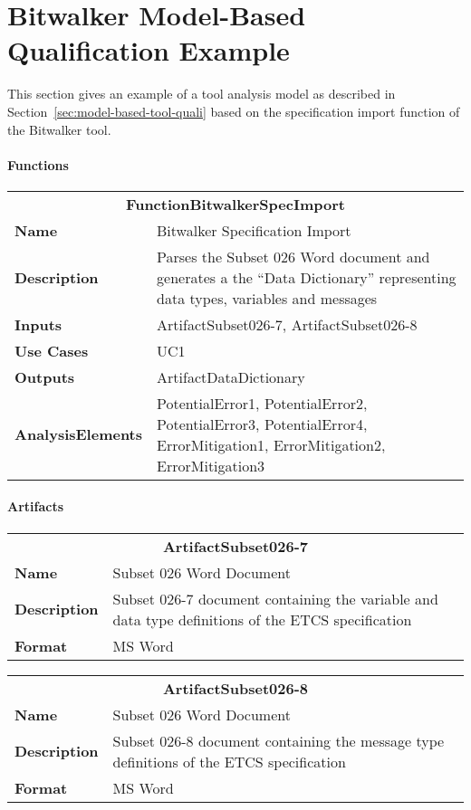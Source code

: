 \section{Bitwalker Model-Based Qualification Example}
\label{sec:bitwalker-example}

This section gives an example of a tool analysis model as described in Section~\ref{sec:model-based-tool-quali} based on the specification import function of the Bitwalker tool.
\paragraph{Functions}

\begin{tabular}{|lp{}|}
\hline
\multicolumn{2}{|c|}{\bf FunctionBitwalkerSpecImport}\\
\bf Name& Bitwalker Specification Import\\
\bf Description&Parses the Subset 026 Word document and generates a the ``Data Dictionary'' representing data types, variables and messages\\
\bf Inputs&ArtifactSubset026-7, ArtifactSubset026-8\\
\bf Use Cases&UC1\\
\bf Outputs&ArtifactDataDictionary\\
\bf AnalysisElements&PotentialError1, PotentialError2, PotentialError3, PotentialError4, ErrorMitigation1, ErrorMitigation2, ErrorMitigation3\\
\hline
\end{tabular}

\paragraph{Artifacts}

\begin{tabular}{|lp{}|}
\hline
\multicolumn{2}{|c|}{\bf ArtifactSubset026-7}\\
\bf Name& Subset 026 Word Document\\
\bf Description&Subset 026-7 document containing the variable and data type definitions of the ETCS specification\\
\bf Format&MS Word\\
\hline
\end{tabular}


\begin{tabular}{|lp{}|}
\hline
\multicolumn{2}{|c|}{\bf ArtifactSubset026-8}\\
\bf Name& Subset 026 Word Document\\
\bf Description&Subset 026-8 document containing the message type definitions of the ETCS specification\\
\bf Format&MS Word\\
\hline
\end{tabular}


